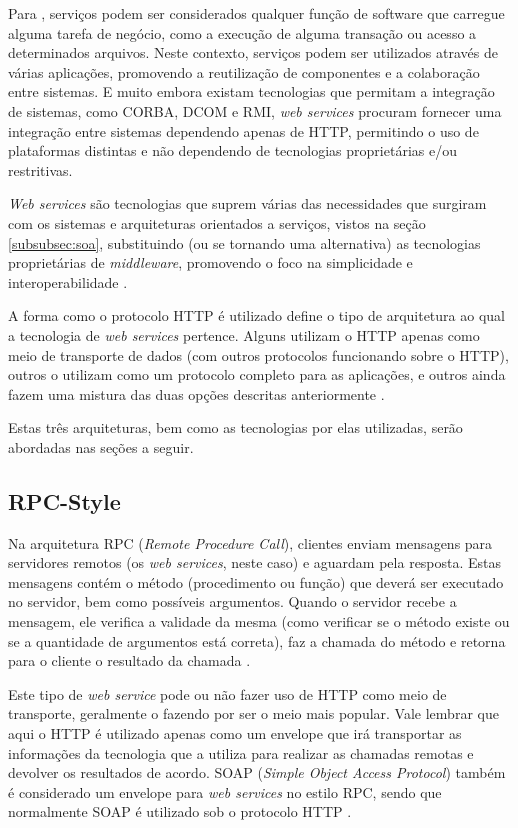 \documentclass[diss]{template/setrem}
\begin{document}
Para \citet{Daigneau2010}, serviços podem ser considerados qualquer função de software que carregue alguma tarefa de negócio, como a execução de alguma transação ou acesso a determinados arquivos. Neste contexto, serviços podem ser utilizados através de várias aplicações, promovendo a reutilização de componentes e a colaboração entre sistemas. E muito embora existam tecnologias que permitam a integração de sistemas, como CORBA, DCOM e RMI, \emph{web services} procuram fornecer uma integração entre sistemas dependendo apenas de HTTP, permitindo o uso de plataformas distintas e não dependendo de tecnologias proprietárias e/ou restritivas.

\emph{Web services} são tecnologias que suprem várias das necessidades que surgiram com os sistemas e arquiteturas orientados a serviços, vistos na seção \ref{subsubsec:soa}, substituindo (ou se tornando uma alternativa) as tecnologias proprietárias de \emph{middleware}, promovendo o foco na simplicidade e interoperabilidade \citep{Gorton2011}.

A forma como o protocolo HTTP é utilizado define o tipo de arquitetura ao qual a tecnologia de \emph{web services} pertence. Alguns utilizam o HTTP apenas como meio de transporte de dados (com outros protocolos funcionando sobre o HTTP), outros o utilizam como um protocolo completo para as aplicações, e outros ainda fazem uma mistura das duas opções descritas anteriormente \citep{Daigneau2010}.

Estas três arquiteturas, bem como as tecnologias por elas utilizadas, serão abordadas nas seções a seguir.

\subsection{RPC-Style}
Na arquitetura RPC (\emph{Remote Procedure Call}), clientes enviam mensagens para servidores remotos (os \emph{web services}, neste caso) e aguardam pela resposta. Estas mensagens contém o método (procedimento ou função) que deverá ser executado no servidor, bem como possíveis argumentos. Quando o servidor recebe a mensagem, ele verifica a validade da mesma (como verificar se o método existe ou se a quantidade de argumentos está correta), faz a chamada do método e retorna para o cliente o resultado da chamada \citep{Daigneau2010}.

Este tipo de \emph{web service} pode ou não fazer uso de HTTP como meio de transporte, geralmente o fazendo por ser o meio mais popular. Vale lembrar que aqui o HTTP é utilizado apenas como um envelope que irá transportar as informações da tecnologia que a utiliza para realizar as chamadas remotas e devolver os resultados de acordo. SOAP (\emph{Simple Object Access Protocol}) também é considerado um envelope para \emph{web services} no estilo RPC, sendo que normalmente SOAP é utilizado sob o protocolo HTTP \citep{Richardson2007}.
\end{document}
